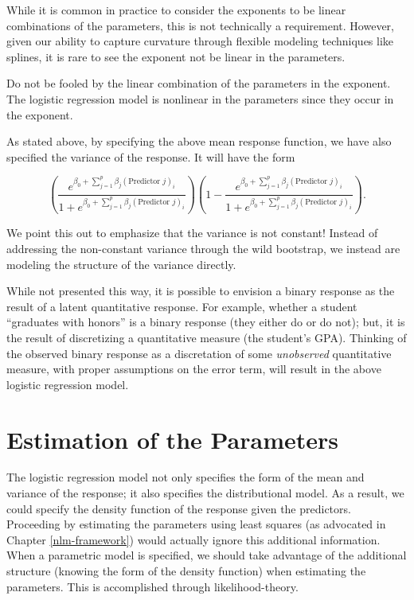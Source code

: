 \documentclass[
]{book}
\theoremstyle{plain}
\theoremstyle{mydefn}
\theoremstyle{myexmpl}
\theoremstyle{remark}
\begin{document}
While it is common in practice to consider the exponents to be linear combinations of the parameters, this is not technically a requirement. However, given our ability to capture curvature through flexible modeling techniques like splines, it is rare to see the exponent not be linear in the parameters.

\begin{rmdwarning}
Do not be fooled by the linear combination of the parameters in the exponent. The logistic regression model is nonlinear in the parameters since they occur in the exponent.\\
\end{rmdwarning}

As stated above, by specifying the above mean response function, we have also specified the variance of the response. It will have the form

\[\left(\frac{e^{\beta_0 + \sum_{j=1}^{p} \beta_j (\text{Predictor } j)_i}}{1 + e^{\beta_0 + \sum_{j=1}^{p} \beta_j (\text{Predictor } j)_i}}\right)\left(1 - \frac{e^{\beta_0 + \sum_{j=1}^{p} \beta_j (\text{Predictor } j)_i}}{1 + e^{\beta_0 + \sum_{j=1}^{p} \beta_j (\text{Predictor } j)_i}}\right).\]

We point this out to emphasize that the variance is not constant! Instead of addressing the non-constant variance through the wild bootstrap, we instead are modeling the structure of the variance directly.

\begin{rmdtip}
While not presented this way, it is possible to envision a binary response as the result of a latent quantitative response. For example, whether a student ``graduates with honors'' is a binary response (they either do or do not); but, it is the result of discretizing a quantitative measure (the student's GPA). Thinking of the observed binary response as a discretation of some \emph{unobserved} quantitative measure, with proper assumptions on the error term, will result in the above logistic regression model.
\end{rmdtip}

\hypertarget{estimation-of-the-parameters}{%
\section{Estimation of the Parameters}\label{estimation-of-the-parameters}}

The logistic regression model not only specifies the form of the mean and variance of the response; it also specifies the distributional model. As a result, we could specify the density function of the response given the predictors. Proceeding by estimating the parameters using least squares (as advocated in Chapter \ref{nlm-framework}) would actually ignore this additional information. When a parametric model is specified, we should take advantage of the additional structure (knowing the form of the density function) when estimating the parameters. This is accomplished through likelihood-theory.
\end{document}
